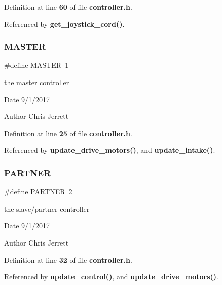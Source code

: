 Definition at line \textbf{ 60} of file \textbf{ controller.\+h}.



Referenced by \textbf{ get\+\_\+joystick\+\_\+cord()}.

\mbox{\label{controller_8h_a3fa2d3bf1901157f734a584d47b25d8b}} 
\subsubsection{M\+A\+S\+T\+ER}
{\footnotesize\ttfamily \#define M\+A\+S\+T\+ER~1}



the master controller 

\begin{DoxyDate}{Date}
9/1/2017 
\end{DoxyDate}
\begin{DoxyAuthor}{Author}
Chris Jerrett 
\end{DoxyAuthor}


Definition at line \textbf{ 25} of file \textbf{ controller.\+h}.



Referenced by \textbf{ update\+\_\+drive\+\_\+motors()}, and \textbf{ update\+\_\+intake()}.

\mbox{\label{controller_8h_a136e64cf351535da81cacb6a546cade6}} 
\subsubsection{P\+A\+R\+T\+N\+ER}
{\footnotesize\ttfamily \#define P\+A\+R\+T\+N\+ER~2}



the slave/partner controller 

\begin{DoxyDate}{Date}
9/1/2017 
\end{DoxyDate}
\begin{DoxyAuthor}{Author}
Chris Jerrett 
\end{DoxyAuthor}


Definition at line \textbf{ 32} of file \textbf{ controller.\+h}.



Referenced by \textbf{ update\+\_\+control()}, and \textbf{ update\+\_\+drive\+\_\+motors()}.

